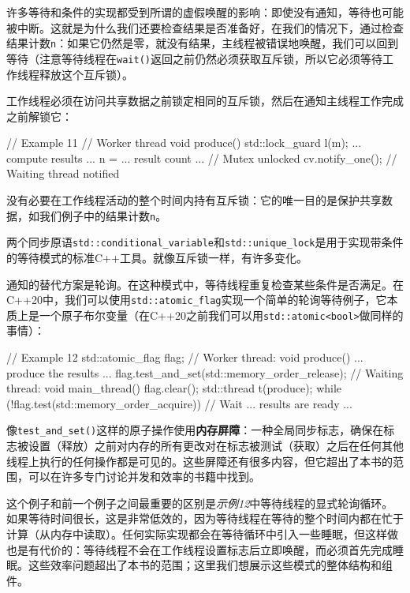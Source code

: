 许多等待和条件的实现都受到所谓的虚假唤醒的影响：即使没有通知，等待也可能被中断。这就是为什么我们还要检查结果是否准备好，在我们的情况下，通过检查结果计数\texttt{n}：如果它仍然是零，就没有结果，主线程被错误地唤醒，我们可以回到等待（注意等待线程在\texttt{wait()}返回之前仍然必须获取互斥锁，所以它必须等待工作线程释放这个互斥锁）。

工作线程必须在访问共享数据之前锁定相同的互斥锁，然后在通知主线程工作完成之前解锁它：

\begin{code}
// Example 11
// Worker thread
void produce() {
  {
    std::lock_guard l(m);
    ... compute results ...
    n = ... result count ...
  } // Mutex unlocked
  cv.notify_one();          // Waiting thread notified
}
\end{code}

没有必要在工作线程活动的整个时间内持有互斥锁：它的唯一目的是保护共享数据，如我们例子中的结果计数\texttt{n}。

两个同步原语\texttt{std::conditional\_variable}和\texttt{std::unique\_lock}是用于实现带条件的等待模式的标准C++工具。就像互斥锁一样，有许多变化。

通知的替代方案是轮询。在这种模式中，等待线程重复检查某些条件是否满足。在C++20中，我们可以使用\texttt{std::atomic\_flag}实现一个简单的轮询等待例子，它本质上是一个原子布尔变量（在C++20之前我们可以用\texttt{std::atomic\textless{}bool\textgreater{}}做同样的事情）：

\begin{code}
// Example 12
std::atomic_flag flag;
// Worker thread:
void produce() {
  ... produce the results ...
  flag.test_and_set(std::memory_order_release);
}
// Waiting thread:
void main_thread() {
  flag.clear();
  std::thread t(produce);
  while (!flag.test(std::memory_order_acquire)) {} // Wait
  ... results are ready ...
}
\end{code}

像\texttt{test\_and\_set()}这样的原子操作使用\textbf{内存屏障}：一种全局同步标志，确保在标志被设置（释放）之前对内存的所有更改对在标志被测试（获取）之后在任何其他线程上执行的任何操作都是可见的。这些屏障还有很多内容，但它超出了本书的范围，可以在许多专门讨论并发和效率的书籍中找到。

这个例子和前一个例子之间最重要的区别是\emph{示例12}中等待线程的显式轮询循环。如果等待时间很长，这是非常低效的，因为等待线程在等待的整个时间内都在忙于计算（从内存中读取）。任何实际实现都会在等待循环中引入一些睡眠，但这样做也是有代价的：等待线程不会在工作线程设置标志后立即唤醒，而必须首先完成睡眠。这些效率问题超出了本书的范围；这里我们想展示这些模式的整体结构和组件。

